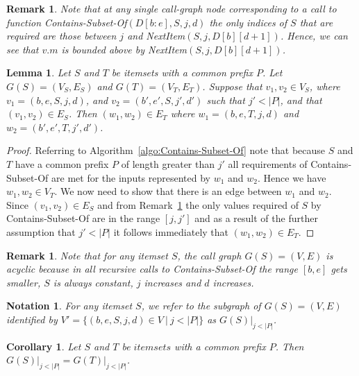 \documentclass[13pt,a4paper]{article}
\newtheorem{lemma}[theorem]{Lemma}
\newtheorem{corollary}[theorem]{Corollary}
\newtheorem{notation}[theorem]{Notation}
\newtheorem{remark}[theorem]{Remark}
\begin{document}
\begin{remark}
\label{MartinRemark}
Note that at any \textit{single} call-graph node corresponding to a call to function Contains-Subset-Of$(D[b:e], S, j, d)$ the only indices of $S$ that are required are those between $j$ and NextItem$(S, j, D[b][d+1])$. Hence, we can see that $v.m$ is bounded above by NextItem$(S, j, D[b][d+1])$.
\end{remark}

\begin{lemma}
\label{MartinLemma}
Let $S$ and $T$ be itemsets with a common prefix $P$. Let $G(S) = (V_S, E_S)$ and $G(T) = (V_T, E_T)$. 
Suppose that $v_1, v_2 \in V_S$, where $v_1 = (b, e, S, j, d)$, and $v_2 = (b', e', S, j', d')$ such that $j' < \vert P \vert$, and that $(v_1, v_2) \in E_S$. 
Then $(w_1, w_2) \in E_T$ where $w_1=(b, e, T, j, d)$ and  $w_2=(b', e', T, j', d')$.
\end{lemma}

\begin{proof}
Referring to Algorithm~\ref{algo:Contains-Subset-Of} note that because $S$ and $T$ have a common prefix $P$ of length greater than $j'$ all requirements of Contains-Subset-Of are met for the inputs represented by $w_1$ and $w_2$. Hence we have $w_1, w_2 \in V_T$. We now need to show that there is an edge between $w_1$ and $w_2$. Since $(v_1, v_2) \in E_S$ and from Remark~\ref{MartinRemark} the only values required of $S$ by Contains-Subset-Of are in the range $[j, j']$ and as a result of the further assumption that $j' < \vert P \vert$ it follows immediately that $(w_1, w_2) \in E_T$.
\end{proof}

\begin{remark}
Note that for any itemset $S$, the call graph $G(S) = (V, E)$ is acyclic because in all recursive calls to Contains-Subset-Of the range $[b, e]$ gets smaller, $S$ is always constant, $j$ increases and $d$ increases. 
\end{remark}

\begin{notation}
For any itemset $S$, we refer to the subgraph of $G(S) = (V, E)$ identified by $V'=\{(b, e, S, j, d) \in V ~\lvert~ j < \lvert P \lvert\}$ as $G(S) \lvert_{j < \lvert P \lvert}$.
\end{notation}

\begin{corollary}
\label{MartinCorollary}
Let $S$ and $T$ be $itemsets$ with a common prefix $P$.
Then $G(S) \lvert_{j < \lvert P \lvert} = G(T) \lvert_{j < \lvert P \lvert}$.
\end{corollary}
\end{document}
